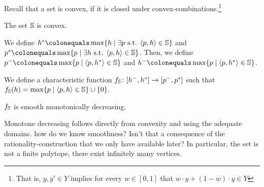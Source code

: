 {{{\begin{example}
	
\end{example}

Recall that a set is convex, if it is closed under convex-combinations.\footnote{That is, $y, y' \in Y$ implies for every $w \in [0,1]$ that $w \cdot y + (1-w) \cdot y \in Y$}
\begin{proposition}
	The set $\mathbb{S}$ is convex. 
\end{proposition}

\begin{definition}
We define 
$\rndopt \colonequals \max \{ \rndp \mid \exists \scp \text{ s.t. } \langle \scp, \rndp \rangle \in \solutions  \} $
and 
$\scopt \colonequals \max \{ \scp \mid \exists \rndp \text{ s.t. } \langle \scp, \rndp \rangle \in \solutions  \} $.
Then, we define 
$\scmin \colonequals \max \{ \scp \mid \langle \scp, \rndopt \rangle  \in \solutions \}$ and $\rndmin \colonequals \max \{ \scp \mid \langle \scp, \rndopt \rangle  \in \solutions \}$.
\end{definition}





We define a characteristic function $f_\mathbb{S}\colon [h^{-},h^{*}] \rightarrow [p^{-},p^{*}]$ such that $f_\mathbb{S}(h) = \max \{ p \mid \langle p, h \rangle \in \mathbb{S} \} \cup \{ 0 \}$.  
\begin{proposition}
	$f_\mathbb{S}$ is smooth monotonically decreasing. 
\end{proposition}
Monotone decreasing follows directly from convexity and using the adequate domains. 
{\color{red}how do we know smoothness? Isn't that a consequence of the rationality-construction that we only have available later?}
In particular, the set is not a finite polytope, there exist infinitely many vertices.


 
\begin{figure}
\centering
\begin{subfigure}{0.2\columnwidth}
\centering
{}
\end{subfigure}
\end{figure}}}}
